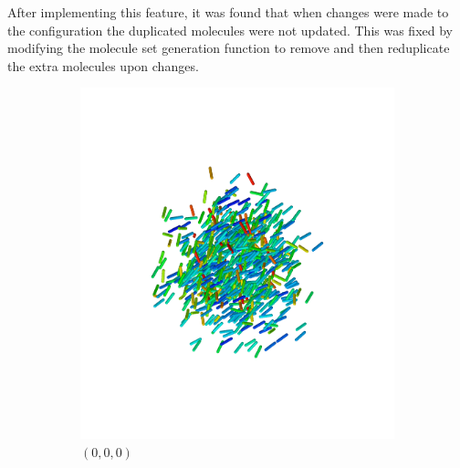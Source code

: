 After implementing this feature, it was found that when changes were made to the configuration the duplicated molecules were not updated. This was fixed by modifying the molecule set generation function to remove and then reduplicate the extra molecules upon changes.

\begin{figure}
  \begin{center}
    \begin{subfigure}{0.3\textwidth}
      \includegraphics[width=\textwidth]{assets/images/periodic/1}
      \caption{$(0,0,0)$}
      \label{fig:periodic_1}
    \end{subfigure}
        \begin{subfigure}{0.3\textwidth}

\end{subfigure}
\end{center}
\end{figure}
